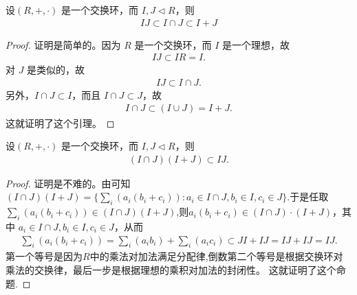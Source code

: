 \documentclass[../../main.tex]{subfiles}
\begin{document}
\begin{lemma}\label{lemma:IJ、I与J的交、I+J的关系}
设$(R, +, \cdot)$ 是一个交换环，而 $I, J \lhd R$，则
\begin{align*}
IJ \subset I \cap J \subset I + J
\end{align*}
\end{lemma}
\begin{proof}
证明是简单的。因为 $R$ 是一个交换环，而 $I$ 是一个理想，故
\begin{align*}
IJ \subset IR = I.
\end{align*}
对 $J$ 是类似的，故
\begin{align*}
IJ \subset I \cap J.
\end{align*}
另外，$I \cap J \subset I$，而且 $I \cap J \subset J$，故
\begin{align*}
I \cap J \subset (I \cup J) = I + J.
\end{align*}
这就证明了这个引理。
\end{proof}

\begin{lemma}\label{lemma:I与J的交、I+J的乘积包含于IJ}
设$(R, +, \cdot)$ 是一个交换环，而 $I, J \lhd R$，则
\begin{align*}
(I \cap J)(I + J) \subset IJ .
\end{align*}
\end{lemma}
\begin{proof}
证明是不难的。由可知$(I \cap J)(I + J)=\{\sum_i (a_i(b_i + c_i)):a_i \in I \cap J, b_i \in I, c_i \in J\}.$于是任取$\sum_i (a_i(b_i + c_i)) \in (I \cap J)(I + J)$,则$a_i(b_i + c_i) \in (I \cap J)\cdot (I + J)$，其中 $a_i \in I \cap J, b_i \in I, c_i \in J$，从而
\begin{align*}
\sum_i (a_i(b_i + c_i)) = \sum_i (a_ib_i) + \sum_i (a_ic_i) \subset JI + IJ = IJ + IJ = IJ .
\end{align*}
第一个等号是因为$R$中的乘法对加法满足分配律,倒数第二个等号是根据交换环对乘法的交换律，最后一步是根据理想的乘积对加法的封闭性。
这就证明了这个命题.
\end{proof}
\end{document}
